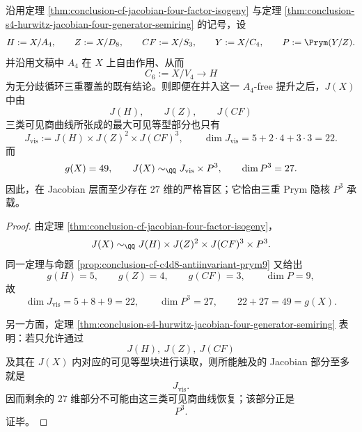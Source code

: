 \begin{theorem}\label{thm:conclusion-cf-a4free-visible-part-only-twenty-two-over-forty-nine}
沿用定理 \ref{thm:conclusion-cf-jacobian-four-factor-isogeny} 与定理 \ref{thm:conclusion-s4-hurwitz-jacobian-four-generator-semiring} 的记号，设
\[
H:=X/A_4,\qquad
Z:=X/D_8,\qquad
CF:=X/S_3,\qquad
Y:=X/C_4,\qquad
P:=\Prym(Y/Z).
\]
并沿用文稿中 \(A_4\) 在 \(X\) 上自由作用、从而
\[
C_6:=X/V_4\to H
\]
为无分歧循环三重覆盖的既有结论。则即便在并入这一 \(A_4\)-free 提升之后，\(J(X)\) 中由
\[
J(H),\qquad J(Z),\qquad J(CF)
\]
三类可见商曲线所张成的最大可见等型部分也只有
\[
J_{\mathrm{vis}}
:=
J(H)\times J(Z)^2\times J(CF)^3,
\qquad
\dim J_{\mathrm{vis}}=5+2\cdot 4+3\cdot 3=22.
\]
而
\[
g(X)=49,
\qquad
J(X)\sim_{\QQ} J_{\mathrm{vis}}\times P^3,
\qquad
\dim P^3=27.
\]
因此，在 Jacobian 层面至少存在 \(27\) 维的严格盲区；它恰由三重 Prym 隐核 \(P^3\) 承载。
\end{theorem}
\begin{proof}
由定理 \ref{thm:conclusion-cf-jacobian-four-factor-isogeny}，
\[
J(X)\sim_{\QQ}J(H)\times J(Z)^2\times J(CF)^3\times P^3.
\]
同一定理与命题 \ref{prop:conclusion-cf-c4d8-antiinvariant-prym9} 又给出
\[
g(H)=5,\qquad g(Z)=4,\qquad g(CF)=3,\qquad \dim P=9,
\]
故
\[
\dim J_{\mathrm{vis}}=5+8+9=22,
\qquad
\dim P^3=27,
\qquad
22+27=49=g(X).
\]

另一方面，定理 \ref{thm:conclusion-s4-hurwitz-jacobian-four-generator-semiring} 表明：若只允许通过
\[
J(H),\ J(Z),\ J(CF)
\]
及其在 \(J(X)\) 内对应的可见等型块进行读取，则所能触及的 Jacobian 部分至多就是
\[
J_{\mathrm{vis}}.
\]
因而剩余的 \(27\) 维部分不可能由这三类可见商曲线恢复；该部分正是
\[
P^3.
\]
证毕。
\end{proof}

